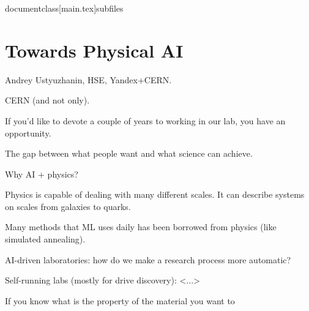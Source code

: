 documentclass[main.tex]{subfiles}

	
\section{Towards Physical AI}

Andrey Ustyuzhanin, HSE, Yandex+CERN.

CERN (and not only).

If you'd like to devote a couple of years to working in our lab, you have an opportunity.

The gap between what people want and what science can achieve.

Why AI + physics?

Physics is capable of dealing with many different scales.
It can describe systems on  scales from galaxies to quarks.

Many methods that ML uses daily has been borrowed from physics (like simulated annealing).

AI-driven laboratories:
how do we make a research process more automatic?

Self-running labs (mostly for drive discovery): <...>

If you know what is the property of the material you want to 

